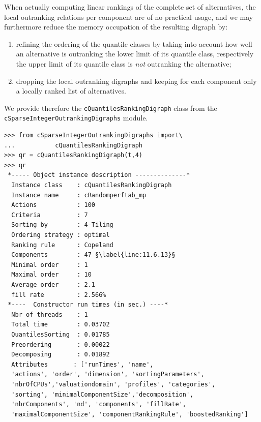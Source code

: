 When actually computing linear rankings of the complete set of alternatives, the local outranking relations per component are of no practical usage, and we may furthermore reduce the memory occupation of the resulting digraph by:
\begin{enumerate}[topsep=2pt]
\item refining the ordering of the quantile classes by taking into account how well an alternative is outranking the lower limit of its quantile class, respectively the upper limit of its quantile class is \emph{not} outranking the alternative;
\item dropping the local outranking digraphs and keeping for each component only a locally ranked list of alternatives.
\end{enumerate}

We provide therefore the \texttt{cQuantilesRankingDigraph} class from the \texttt{cSparseIntegerOutrankingDigraphs} module.
\begin{lstlisting}[caption={Ranking the sparse integer outranking digraph},label=list:11.6]
>>> from cSparseIntegerOutrankingDigraphs import\
...           cQuantilesRankingDigraph
>>> qr = cQuantilesRankingDigraph(t,4)
>>> qr
 *----- Object instance description --------------*
  Instance class    : cQuantilesRankingDigraph
  Instance name     : cRandomperftab_mp
  Actions           : 100
  Criteria          : 7
  Sorting by        : 4-Tiling
  Ordering strategy : optimal
  Ranking rule      : Copeland
  Components        : 47 §\label{line:11.6.13}§
  Minimal order     : 1
  Maximal order     : 10
  Average order     : 2.1
  fill rate         : 2.566%
 *----  Constructor run times (in sec.) ----*
  Nbr of threads    : 1
  Total time        : 0.03702
  QuantilesSorting  : 0.01785
  Preordering       : 0.00022
  Decomposing       : 0.01892
  Attributes       : ['runTimes', 'name',
  'actions', 'order', 'dimension', 'sortingParameters',
  'nbrOfCPUs','valuationdomain', 'profiles', 'categories',
  'sorting', 'minimalComponentSize','decomposition',
  'nbrComponents', 'nd', 'components', 'fillRate',
  'maximalComponentSize', 'componentRankingRule', 'boostedRanking']
\end{lstlisting}

